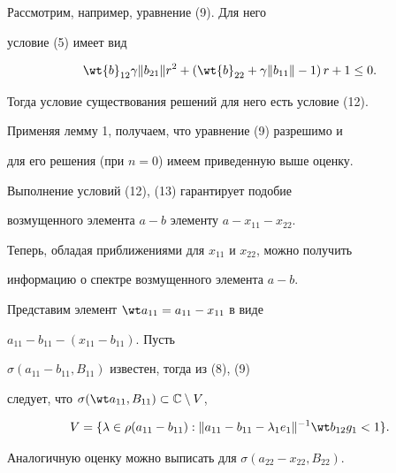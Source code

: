 \begin{pf}


Рассмотрим, например, уравнение (9). Для него


условие (5) имеет вид


$$


\wt{b}_{12}\gamma\|b_{21}\|r^2+\left(\wt{b}_{22}+\gamma\|b_{11}\|-1\right)r


+1\leq 0.


$$


Тогда условие существования решений для него есть условие (12).


Применяя лемму 1, получаем, что уравнение (9) разрешимо и


для его решения (при $n=0$) имеем приведенную выше оценку.


\end{pf}








\begin{notenonum}


Выполнение условий (12), (13) гарантирует подобие


возмущенного элемента $a-b$ элементу $a-x_{11}-x_{22}$.


\end{notenonum}





Теперь, обладая приближениями для $x_{11}$ и $x_{22}$, можно получить


информацию о спектре возмущенного элемента $a-b$.





Представим элемент $\wt a_{11}=a_{11}-x_{11}$ в виде


$a_{11}-b_{11}-(x_{11}-b_{11})$. Пусть


$\sigma(a_{11}-b_{11},B_{11})$ известен, тогда из (8), (9)


следует, что $\sigma(\wt a_{11},B_{11})\subset\Bbb{C}\setminus V$,


$$


V=\{\lambda\in\rho(a_{11}-b_{11}):\|a_{11}-b_{11}-


\lambda_1e_1\|^{-1}\wt b_{12}g_1<1\}.


$$


Аналогичную оценку можно выписать для $\sigma(a_{22}-x_{22},B_{22})$.





